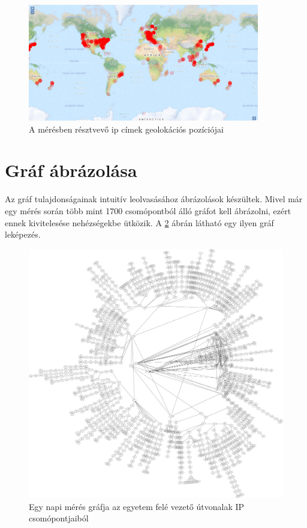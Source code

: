 \begin{figure}[h]
	\centering
	\includegraphics[width=0.9\textwidth, keepaspectratio]{figures/ip_map.png}
	\caption{A mérésben résztvevő ip címek geolokációs pozíciójai}
	\label{fig:ip-map}
\end{figure}

\section{Gráf ábrázolása}

Az gráf tulajdonságainak intuitív leolvasásához ábrázolások készültek. Mivel már egy mérés során több mint 1700 csomópontból álló gráfot kell ábrázolni, ezért ennek kivitelesése nehézségekbe ütközik. A \ref{fig:graph} ábrán látható egy ilyen gráf leképezés.

\begin{figure}[!ht]
	\centering
	\includegraphics[width=1\textwidth, keepaspectratio]{figures/graph.png}
	\caption{Egy napi mérés gráfja az egyetem felé vezető útvonalak IP csomópontjaiból\label{fig:graph}}
\end{figure}

